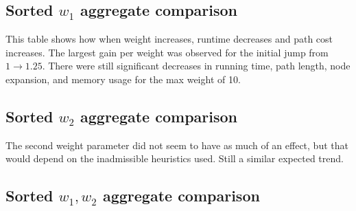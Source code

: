 \documentclass[11pt,letter]{article}
\begin{document}
\subsection{Sorted $w_1$ aggregate comparison}
\par This table shows how when weight increases, runtime decreases and path cost increases. The largest gain per weight was observed for the initial jump from $1 \rightarrow 1.25$. There were still significant decreases in running time, path length, node expansion, and memory usage for the max weight of 10.

\subsection{Sorted $w_2$ aggregate comparison}
\par The second weight parameter did not seem to have as much of an effect, but that would depend on the inadmissible heuristics used. Still a similar expected trend.
\subsection{Sorted $w_1, w_2$ aggregate comparison}
\end{document}
